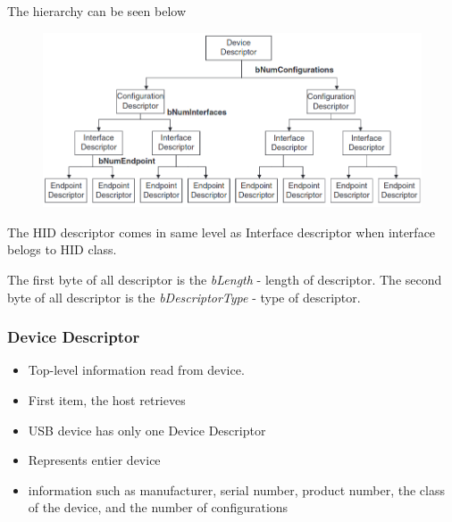 \documentclass{article}
\begin{document}
The hierarchy can be seen below
\begin{figure}[H]
    \begin{center}
        \includegraphics[scale=0.5]{DocuResources/DescriptorHierarchy.png}
    \end{center}
\end{figure}
The HID descriptor comes in same level as Interface descriptor when interface belogs to HID class.

The first byte of all descriptor is the \textit{bLength} - length of descriptor.
The second byte of all descriptor is the \textit{bDescriptorType} - type of descriptor.

\subsubsection{Device Descriptor}
\begin{itemize}
    \item Top-level information read from device.
    \item First item, the host retrieves
    \item USB device has only one Device Descriptor
    \item Represents entier device
    \item information such as manufacturer, serial number, product number, the class of the device, and the number of configurations
\end{itemize}
\end{document}
